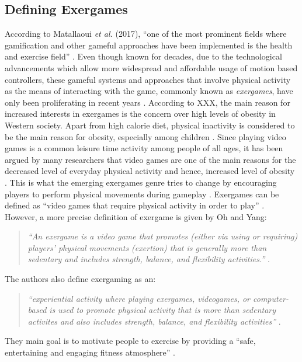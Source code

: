 \subsection{Defining Exergames}
According to Matallaoui \textit{et al.} (2017), ``one of the most prominent fields where
gamification and other gameful approaches have been
implemented is the health and exercise field'' \cite{matallaoui2017effective}. Even though known for decades, due to the technological advancements which allow more widespread and affordable usage of motion based controllers, these gameful systems and approaches that involve physical activity as the means of interacting with the game, commonly known as \textit{exergames}, have only been proliferating 
in recent years \cite{matallaoui2017effective}. 
According to XXX, the main reason for increased interests in exergames is the concern over high levels of obesity in Western society. Apart from high calorie diet, physical inactivity is considered to be the main reason for obesity, especially among children \cite{kiili2010developing}. Since playing video games is a common leisure time activity among people of all ages, it has been argued by many researchers \cite{kiili2010developing} that video games are one of the main reasons for the decreased level of everyday physical activity and hence, increased level of obesity \cite{vandewater2004linking}. This is what the emerging exergames genre tries to change by encouraging players to perform physical movements during gameplay \cite{kiili2010developing}. Exergames can be defined as ``video games that require physical activity in order to play'' \cite{oh2010defining}. However, a more precise definition of exergame is given by Oh and Yang:
\begin{quotation}
\textit{``An exergame is a video
game that promotes (either via using or requiring) players’ physical movements (exertion) that is
generally more than sedentary and includes strength, balance, and flexibility activities.''} \cite{oh2010defining}.
\end{quotation}
The authors also define exergaming as an: 
\begin{quotation}
\textit{``experiential activity where playing exergames, videogames, or computer-based is used to promote physical activity that is more than sedentary activites and also includes strength, balance,
and flexibility activities''} \cite{oh2010defining}.
\end{quotation}
They main goal is to motivate people to exercise by providing a  ``safe, entertaining and engaging fitness atmosphere'' \cite{altamimi2012survey}.



